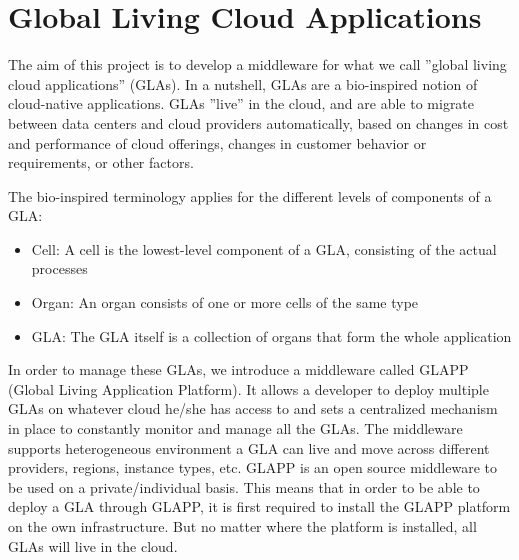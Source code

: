 \documentclass{seal_thesis}
\begin{document}
\section{Global Living Cloud Applications}

The aim of this project is to develop a middleware for what we call ''global living cloud applications'' (GLAs).
In a nutshell, GLAs are a bio-inspired notion of cloud-native applications.
GLAs ''live'' in the cloud, and are able to migrate between data centers and cloud providers automatically, based on changes in cost and performance of cloud offerings, changes in customer behavior or requirements, or other factors.



The bio-inspired terminology applies for the different levels of components of a GLA:

\begin{itemize}
	\item Cell: A cell is the lowest-level component of a GLA, consisting of the actual processes 
	\item Organ: An organ consists of one or more cells of the same type 
	\item GLA: The GLA itself is a collection of organs that form the whole application
\end{itemize}

In order to manage these GLAs, we introduce a middleware called GLAPP (Global Living Application Platform).
It allows a developer to deploy multiple GLAs on whatever cloud he/she has access to and sets a centralized mechanism in place to constantly monitor and manage all the GLAs.
The middleware supports heterogeneous environment a GLA can live and move across different providers, regions, instance types, etc.
GLAPP is an open source middleware to be used on a private/individual basis.
This means that in order to be able to deploy a GLA through GLAPP, it is first required to install the GLAPP platform on the own infrastructure.
But no matter where the platform is installed, all GLAs will live in the cloud.
\end{document}
